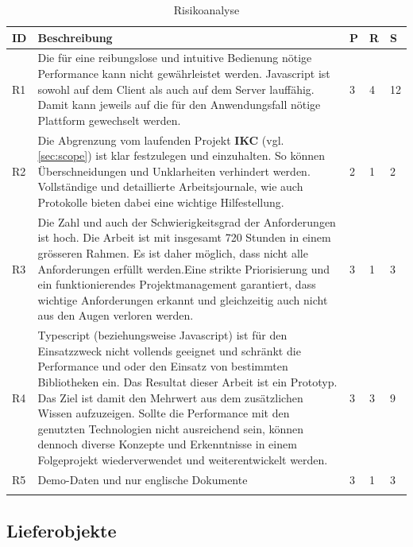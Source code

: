 \begin{longtable}{|p{0.5cm} | p{7cm} | p{1cm}|  p{1cm}|  p{1cm}|}
  \hline
    ID & Beschreibung &  P & R & S \\\hline
    R1 & Die für eine reibungslose und intuitive Bedienung nötige Performance kann nicht gewährleistet werden.\newline\newline
    Javascript ist sowohl auf dem Client als auch auf dem Server lauffähig. Damit kann jeweils auf die für den Anwendungsfall nötige Plattform gewechselt werden. & 3 & 4 & 12\\\hline
    R2 & Die Abgrenzung vom laufenden Projekt \textbf{\acrshort{IKC}} (vgl. \autoref{sec:scope}) ist klar festzulegen und einzuhalten. So können Überschneidungen und Unklarheiten verhindert werden.\newline\newline
    Vollständige und detaillierte Arbeitsjournale, wie auch Protokolle bieten dabei eine wichtige Hilfestellung. & 2 & 1 & 2\\\hline
    R3 & Die Zahl und auch der Schwierigkeitsgrad der Anforderungen ist hoch. Die Arbeit ist mit insgesamt 720 Stunden in einem grösseren Rahmen. Es ist daher möglich, dass nicht alle Anforderungen erfüllt werden.\newline\newline Eine strikte Priorisierung und ein funktionierendes Projektmanagement garantiert, dass wichtige Anforderungen erkannt und gleichzeitig auch nicht aus den Augen verloren werden. & 3 & 1 & 3\\\hline
    R4 & Typescript (beziehungsweise Javascript) ist für den Einsatzzweck nicht vollends geeignet und schränkt die Performance und oder den Einsatz von bestimmten Bibliotheken ein.\newline\newline
    Das Resultat dieser Arbeit ist ein Prototyp. Das Ziel ist damit den Mehrwert aus dem zusätzlichen Wissen aufzuzeigen. Sollte die Performance mit den genutzten Technologien nicht ausreichend sein, können dennoch diverse Konzepte und Erkenntnisse in einem Folgeprojekt wiederverwendet und weiterentwickelt werden.& 3 & 3 & 9\\\hline
    R5 & Demo-Daten und nur englische Dokumente & 3 & 1 & 3\\\hline
    \caption{Risikoanalyse}
  \label{tab:risikoanalyse}
\end{longtable}

\subsection{Lieferobjekte}\label{lieferobjekte}


